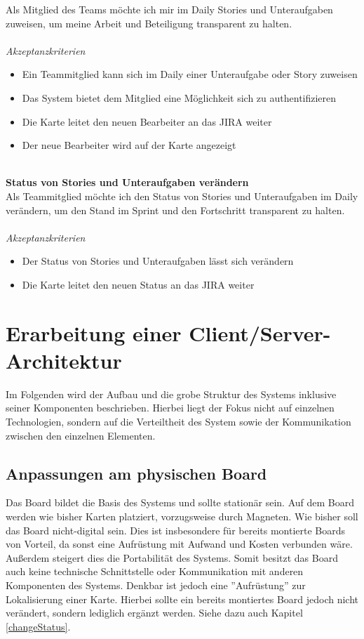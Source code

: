 \documentclass[12pt,titlepage]{scrartcl}
\begin{document}
	Als Mitglied des Teams möchte ich mir im Daily Stories und Unteraufgaben zuweisen, um meine Arbeit und Beteiligung transparent zu halten. \\ \\
	\textit{Akzeptanzkriterien}
	\begin{itemize}
		\setlength\itemsep{0em}
		\item Ein Teammitglied kann sich im Daily einer Unteraufgabe oder Story zuweisen
		\item Das System bietet dem Mitglied eine Möglichkeit sich zu authentifizieren
		\item Die Karte leitet den neuen Bearbeiter an das JIRA weiter
		\item Der neue Bearbeiter wird auf der Karte angezeigt
	\end{itemize}
	\noindent
	\\ \textbf{Status von Stories und Unteraufgaben verändern} \\
	Als Teammitglied möchte ich den Status von Stories und Unteraufgaben im Daily verändern, um den Stand im Sprint und den Fortschritt transparent zu halten.\\ \\
	\textit{Akzeptanzkriterien}
	\begin{itemize}
		\setlength\itemsep{0em}
		\item Der Status von Stories und Unteraufgaben lässt sich verändern
		\item Die Karte leitet den neuen Status an das JIRA weiter
	\end{itemize}

	\newpage	
	\section{Erarbeitung einer Client/Server-Architektur}
	Im Folgenden wird der Aufbau und die grobe Struktur des Systems inklusive seiner Komponenten beschrieben. Hierbei liegt der Fokus nicht auf einzelnen Technologien, sondern auf die Verteiltheit des System sowie der Kommunikation zwischen den einzelnen Elementen.
		\subsection{Anpassungen am physischen Board}
		Das Board bildet die Basis des Systems und sollte stationär sein. Auf dem Board werden wie bisher Karten platziert, vorzugsweise durch Magneten. Wie bisher soll das Board nicht-digital sein. Dies ist insbesondere für bereits montierte Boards von Vorteil, da sonst eine Aufrüstung mit Aufwand und Kosten verbunden wäre. Außerdem steigert dies die Portabilität des Systems. Somit besitzt das Board auch keine technische Schnittstelle oder Kommunikation mit anderen Komponenten des Systems. Denkbar ist jedoch eine ''Aufrüstung'' zur Lokalisierung einer Karte. Hierbei sollte ein bereits montiertes Board jedoch nicht verändert, sondern lediglich ergänzt werden. Siehe dazu auch Kapitel \ref{changeStatus}.
\end{document}
